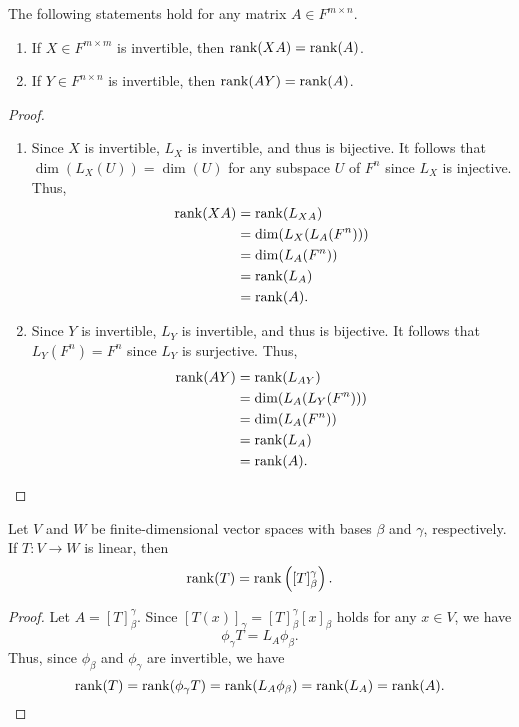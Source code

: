 \begin{theorem}
  \label{thm:rank-preserving}
  The following statements hold for any matrix $A \in F^{m \times n}$.
  \begin{enumerate}
    \item If $X \in F^{m \times m}$ is invertible, then $\operatorname{rank}(XA) = \operatorname{rank}(A)$.
    \item If $Y \in F^{n \times n}$ is invertible, then $\operatorname{rank}(AY) = \operatorname{rank}(A)$.
  \end{enumerate}
\end{theorem}
\begin{proof}
  \leavevmode
  \begin{enumerate}
    \item Since $X$ is invertible, $L_X$ is invertible, and thus is bijective.
    It follows that $\dim(L_X(U)) = \dim(U)$ for any subspace $U$ of $F^n$
    since $L_X$ is injective.
    Thus,
    \begin{align*}
      \operatorname{rank}(XA)
      &= \operatorname{rank}(L_{XA}) \\
      &= \dim(L_X(L_A(F^n))) \\
      &= \dim(L_A(F^n)) \\
      &= \operatorname{rank}(L_A) \\
      &= \operatorname{rank}(A).
    \end{align*}

    \item Since $Y$ is invertible, $L_Y$ is invertible, and thus is bijective.
    It follows that $L_Y(F^n) = F^n$ since $L_Y$ is surjective.
    Thus,
    \begin{align*}
      \operatorname{rank}(AY)
      &= \operatorname{rank}(L_{AY}) \\
      &= \dim(L_A(L_Y(F^n))) \\
      &= \dim(L_A(F^n)) \\
      &= \operatorname{rank}(L_A) \\
      &= \operatorname{rank}(A).
      \qedhere
    \end{align*}
  \end{enumerate}
\end{proof}

\begin{theorem}
  \label{thm:rank-matrix-representation}
  Let $V$ and $W$ be finite-dimensional vector spaces with bases $\beta$ and
  $\gamma$, respectively.
  If $T: V \to W$ is linear, then
  \begin{equation*}
    \operatorname{rank}(T) = \operatorname{rank}\left([T]_\beta^\gamma\right).
  \end{equation*}
\end{theorem}
\begin{proof}
  Let $A = [T]_\beta^\gamma$.
  Since $[T(x)]_\gamma = [T]_\beta^\gamma [x]_\beta$ holds for any $x \in V$,
  we have
  \begin{equation*}
    \phi_\gamma T = L_A \phi_\beta.
  \end{equation*}
  Thus, since $\phi_\beta$ and $\phi_\gamma$ are invertible, we have
  \begin{equation*}
    \operatorname{rank}(T)
    = \operatorname{rank}(\phi_\gamma T)
    = \operatorname{rank}(L_A\phi_\beta)
    = \operatorname{rank}(L_A)
    = \operatorname{rank}(A).
    \qedhere
  \end{equation*}
\end{proof}

